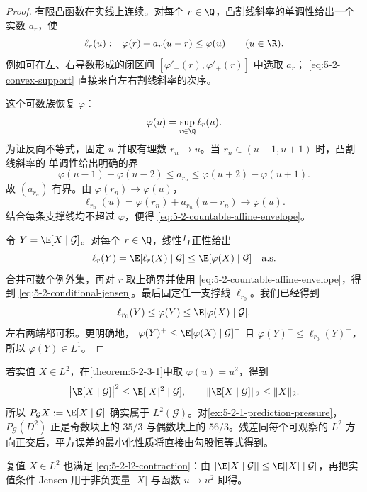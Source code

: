 \begin{proof}
有限凸函数在实线上连续。对每个 $r\in\Q$，凸割线斜率的单调性给出一个实数 $a_r$，使
\begin{equation}\label{eq:5-2-convex-support}
 \ell_r(u):=\varphi(r)+a_r(u-r)\leq\varphi(u)
 \qquad(u\in\R).
\end{equation}
例如可在左、右导数形成的闭区间
$[\varphi'_-(r),\varphi'_+(r)]$ 中选取 $a_r$；
\eqref{eq:5-2-convex-support} 直接来自左右割线斜率的次序。

这个可数族恢复 $\varphi$：
\begin{equation}\label{eq:5-2-countable-affine-envelope}
 \varphi(u)=\sup_{r\in\Q}\ell_r(u).
\end{equation}
为证反向不等式，固定 $u$ 并取有理数 $r_n\to u$。当 $r_n\in(u-1,u+1)$ 时，凸割线斜率的
单调性给出明确的界
\[
 \varphi(u-1)-\varphi(u-2)
 \leq a_{r_n}
 \leq \varphi(u+2)-\varphi(u+1).
\]
故 $(a_{r_n})$ 有界。由 $\varphi(r_n)\to\varphi(u)$，
\[
 \ell_{r_n}(u)=\varphi(r_n)+a_{r_n}(u-r_n)\longrightarrow\varphi(u).
\]
结合每条支撑线均不超过 $\varphi$，便得 \eqref{eq:5-2-countable-affine-envelope}。

令 $Y=\E[X\mid\mathcal G]$。对每个 $r\in\Q$，线性与正性给出
\[
 \ell_r(Y)
 =\E[\ell_r(X)\mid\mathcal G]
 \leq\E[\varphi(X)\mid\mathcal G]
 \quad\text{a.s.}
\]
合并可数个例外集，再对 $r$ 取上确界并使用
\eqref{eq:5-2-countable-affine-envelope}，得到
\eqref{eq:5-2-conditional-jensen}。最后固定任一支撑线 $\ell_{r_0}$。我们已经得到
\[
 \ell_{r_0}(Y)\leq\varphi(Y)\leq\E[\varphi(X)\mid\mathcal G].
\]
左右两端都可积。更明确地，
$\varphi(Y)^+\leq\E[\varphi(X)\mid\mathcal G]^+$ 且
$\varphi(Y)^-\leq\ell_{r_0}(Y)^-$，所以 $\varphi(Y)\in L^1$。
\end{proof}

\begin{remark}[从凸性进入平方几何]\label{rem:5-2-3-l2-entry}
若实值 $X\in L^2$，在\cref{theorem:5-2-3-1}中取 $\varphi(u)=u^2$，得到
\begin{equation}\label{eq:5-2-l2-contraction}
 \bigl|\E[X\mid\mathcal G]\bigr|^2
 \leq\E[|X|^2\mid\mathcal G],
 \qquad
 \|\E[X\mid\mathcal G]\|_2\leq\|X\|_2.
\end{equation}
所以 $P_{\mathcal G}X:=\E[X\mid\mathcal G]$ 确实属于
$L^2(\mathcal G)$。对\cref{ex:5-2-1-prediction-pressure}，
$P_{\mathcal G}(D^2)$ 正是奇数块上的 $35/3$ 与偶数块上的 $56/3$。残差同每个可观察的
$L^2$ 方向正交后，平方误差的最小化性质将直接由勾股恒等式得到。
\end{remark}

复值 $X\in L^2$ 也满足 \eqref{eq:5-2-l2-contraction}：由
$|\E[X\mid\mathcal G]|\leq\E[|X|\mid\mathcal G]$，再把实值条件 Jensen 用于非负变量
$|X|$ 与函数 $u\mapsto u^2$ 即得。

